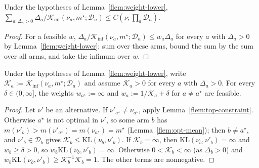 \documentclass[11pt]{article}
\newcommand{\KL}{\mathrm{KL}}
\newcommand{\Kinf}{\mathcal{K}_{\inf}}
\newcommand{\as}{a^{\star}}
\newcommand{\ms}{m^{\star}}
\newcommand{\GL}{C}
\newcommand{\mean}{m}
\newcommand{\gap}{\Delta}
\begin{document}
\begin{lemma}\label{flem:main-lower}
Under the hypotheses of Lemma~\ref{flem:weight-lower},
$\sum_{a:\gap_a>0}\gap_a/\Kinf(\nu_a,\ms;\mathcal D_a)\le\GL(\nu;\prod_a\mathcal D_a)$.
\end{lemma}

\begin{proof}
For a feasible $w$, $\gap_a/\Kinf(\nu_a,\ms;\mathcal D_a)\le w_a\gap_a$ for every $a$ with
$\gap_a>0$ by Lemma~\ref{flem:weight-lower}; sum over these arms, bound the sum by the sum over
all arms, and take the infimum over $w$.
\end{proof}

\begin{lemma}\label{flem:feasible-margin}
Under the hypotheses of Lemma~\ref{flem:weight-lower}, write
$\mathcal K_a:=\Kinf(\nu_a,\ms;\mathcal D_a)$ and assume $\mathcal K_a>0$ for every $a$ with
$\gap_a>0$. For every $\delta\in(0,\infty]$, the weights $w_{\as}:=\infty$ and
$w_a:=1/\mathcal K_a+\delta$ for $a\ne\as$ are feasible.
\end{lemma}

\begin{proof}
Let $\nu'$ be an alternative. If $\nu'_{\as}\ne\nu_{\as}$, apply
Lemma~\ref{flem:top-constraint}. Otherwise $\as$ is not optimal in $\nu'$, so some arm $b$ has
$\mean(\nu'_b)>\mean(\nu'_{\as})=\mean(\nu_{\as})=\ms$ (Lemma~\ref{flem:opt-mean}); then $b\ne\as$,
and $\nu'_b\in\mathcal D_b$ gives $\mathcal K_b\le\KL(\nu_b,\nu'_b)$. If $\mathcal K_b=\infty$, then
$\KL(\nu_b,\nu'_b)=\infty$ and $w_b\ge\delta>0$, so $w_b\KL(\nu_b,\nu'_b)=\infty$. Otherwise
$0<\mathcal K_b<\infty$ (as $\gap_b>0$) and
$w_b\KL(\nu_b,\nu'_b)\ge\mathcal K_b^{-1}\mathcal K_b=1$. The other terms are nonnegative.
\end{proof}
\end{document}
